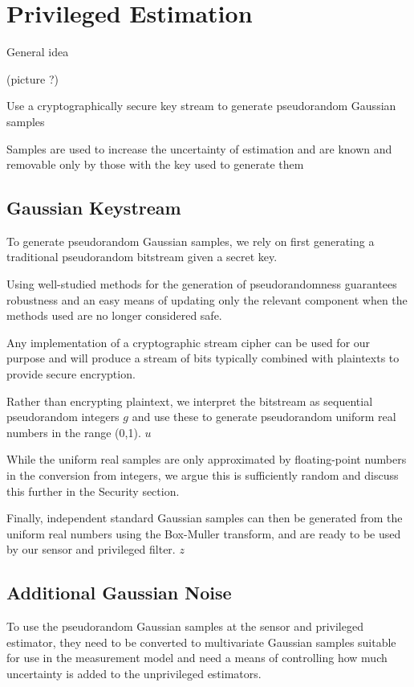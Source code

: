 \documentclass[conference]{IEEEtran}
\theoremstyle{definition}
\theoremstyle{definition}
\theoremstyle{remark}
\begin{document}
\section{Privileged Estimation}
General idea

(picture ?)

Use a cryptographically secure key stream to generate pseudorandom Gaussian samples

Samples are used to increase the uncertainty of estimation and are known and removable only by those with the key used to generate them

\subsection{Gaussian Keystream}
To generate pseudorandom Gaussian samples, we rely on first generating a traditional pseudorandom bitstream given a secret key.

Using well-studied methods for the generation of pseudorandomness guarantees robustness and an easy means of updating only the relevant component when the methods used are no longer considered safe.

Any implementation of a cryptographic stream cipher can be used for our purpose and will produce a stream of bits typically combined with plaintexts to provide secure encryption.

Rather than encrypting plaintext, we interpret the bitstream as sequential pseudorandom integers $g$ and use these to generate pseudorandom uniform real numbers in the range (0,1). $u$

While the uniform real samples are only approximated by floating-point numbers in the conversion from integers, we argue this is sufficiently random and discuss this further in the Security section.

Finally, independent standard Gaussian samples can then be generated from the uniform real numbers using the Box-Muller transform, and are ready to be used by our sensor and privileged filter. $z$

\subsection{Additional Gaussian Noise}
To use the pseudorandom Gaussian samples at the sensor and privileged estimator, they need to be converted to multivariate Gaussian samples suitable for use in the measurement model and need a means of controlling how much uncertainty is added to the unprivileged estimators.
\end{document}
